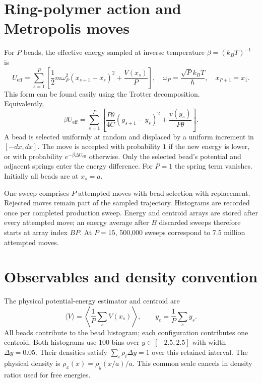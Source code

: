 \documentclass[11pt,a4paper]{report}
\begin{document}
\section{Ring-polymer action and Metropolis moves}
For $P$ beads, the effective energy sampled at inverse temperature $\beta=(k_BT)^{-1}$ is
\begin{equation}
U_{\mathrm{eff}}=\sum_{s=1}^P\left[
\frac12m\omega_P^2(x_{s+1}-x_s)^2+\frac{V(x_s)}{P}\right],
\quad \omega_P=\frac{\sqrt{P}k_BT}{\hbar},\quad x_{P+1}=x_1.
\end{equation}
This form can be found easily using the Trotter decomposition. \\
Equivalently,
\begin{equation}
\beta U_{\mathrm{eff}}=\sum_{s=1}^P\left[
\frac{P\theta}{4C}(y_{s+1}-y_s)^2+\frac{v(y_s)}{P\theta}\right].
\label{eq:action}
\end{equation}
A bead is selected uniformly at random and displaced by a uniform increment in $[-dx,dx]$. The move is accepted with probability $1$ if the new energy is lower, or with probability $e^{-\beta\Delta U_{\mathrm{eff}}}$ otherwise. Only the selected bead's potential and adjacent springs enter the energy difference. For $P=1$ the spring term vanishes. Initially all beads are at $x_s=a$.

One sweep comprises $P$ attempted moves with bead selection with replacement. Rejected moves remain part of the sampled trajectory. Histograms are recorded once per completed production sweep. Energy and centroid arrays are stored after every attempted move; an energy average after $B$ discarded sweeps therefore starts at array index $BP$. At $P=15$, 500,000 sweeps correspond to 7.5 million attempted moves.

\section{Observables and density convention}
The physical potential-energy estimator and centroid are
\begin{equation}
\langle V\rangle=\left\langle\frac1P\sum_sV(x_s)\right\rangle,
\qquad y_c=\frac1P\sum_s y_s.
\end{equation}
All beads contribute to the bead histogram; each configuration contributes one centroid. Both histograms use 100 bins over $y\in[-2.5,2.5]$ with width $\Delta y=0.05$. Their densities satisfy $\sum_i\rho_i\Delta y=1$ over this retained interval. The physical density is $\rho_x(x)=\rho_y(x/a)/a$. This common scale cancels in density ratios used for free energies.
\end{document}
